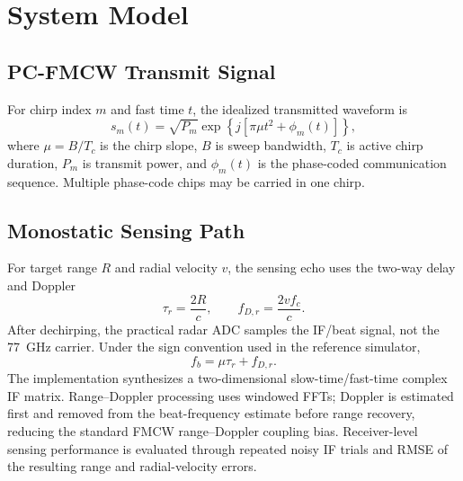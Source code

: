 \documentclass[journal]{IEEEtran}
\begin{document}


\section{System Model}
\label{sec:system}
\subsection{PC-FMCW Transmit Signal}
For chirp index $m$ and fast time $t$, the idealized transmitted waveform is
\begin{equation}
 s_m(t)=\sqrt{P_m}\exp\left\{j\left[\pi\mu t^2+\phi_m(t)\right]\right\},
\end{equation}
where $\mu=B/T_c$ is the chirp slope, $B$ is sweep bandwidth, $T_c$ is active chirp duration, $P_m$ is transmit power, and $\phi_m(t)$ is the phase-coded communication sequence. Multiple phase-code chips may be carried in one chirp.

\subsection{Monostatic Sensing Path}
For target range $R$ and radial velocity $v$, the sensing echo uses the two-way delay and Doppler
\begin{equation}
 \tau_r=\frac{2R}{c}, \qquad f_{D,r}=\frac{2vf_c}{c}.
\end{equation}
After dechirping, the practical radar ADC samples the IF/beat signal, not the \SI{77}{GHz} carrier. Under the sign convention used in the reference simulator,
\begin{equation}
 f_b=\mu\tau_r+f_{D,r}.
\end{equation}
The implementation synthesizes a two-dimensional slow-time/fast-time complex IF matrix. Range--Doppler processing uses windowed FFTs; Doppler is estimated first and removed from the beat-frequency estimate before range recovery, reducing the standard FMCW range--Doppler coupling bias. Receiver-level sensing performance is evaluated through repeated noisy IF trials and RMSE of the resulting range and radial-velocity errors.
\end{document}
